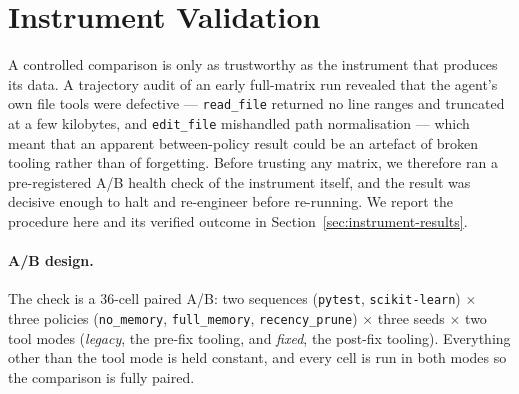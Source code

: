 

\section{Instrument Validation}
\label{sec:instrument}

A controlled comparison is only as trustworthy as the instrument that produces its data. A
trajectory audit of an early full-matrix run revealed that the agent's own file tools were
defective --- \texttt{read\_file} returned no line ranges and truncated at a few kilobytes,
and \texttt{edit\_file} mishandled path normalisation --- which meant that an apparent
between-policy result could be an artefact of broken tooling rather than of forgetting.
Before trusting any matrix, we therefore ran a pre-registered A/B health check of the
instrument itself, and the result was decisive enough to halt and re-engineer before
re-running. We report the procedure here and its verified outcome in
Section~\ref{sec:instrument-results}.

\paragraph{A/B design.}
The check is a 36-cell paired A/B: two sequences (\texttt{pytest}, \texttt{scikit-learn})
$\times$ three policies (\texttt{no\_memory}, \texttt{full\_memory}, \texttt{recency\_prune})
$\times$ three seeds $\times$ two tool modes (\emph{legacy}, the pre-fix tooling, and
\emph{fixed}, the post-fix tooling). Everything other than the tool mode is held constant,
and every cell is run in both modes so the comparison is fully paired.

